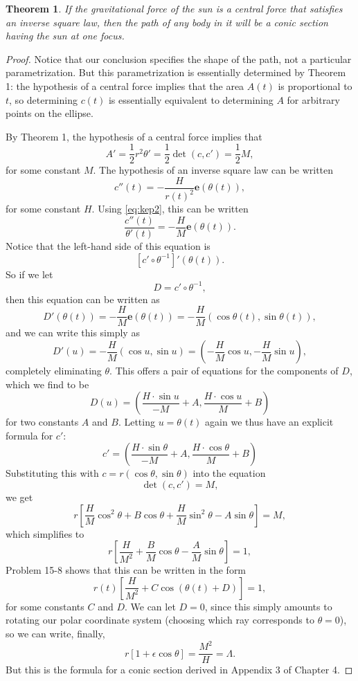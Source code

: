 \documentclass{article}
\newtheorem{theorem}{Theorem}
\begin{document}
\begin{theorem}
  If the gravitational force of the sun is a central force that satisfies an
  inverse square law, then the path of any body in it will be a conic section
  having the sun at one focus.
\end{theorem}
\begin{proof}
  Notice that our conclusion specifies the shape of the path, not a particular
  parametrization. But this parametrization is essentially determined by
  Theorem 1: the hypothesis of a central force implies that the area $A(t)$ is
  proportional to $t$, so determining $c(t)$ is essentially equivalent to
  determining $A$ for arbitrary points on the ellipse.

  By Theorem 1, the hypothesis of a central force implies that
  \begin{equation} \tag{$K_2$}
    A' = \frac{1}{2}r^2\theta' = \frac{1}{2}\det(c, c') = \frac{1}{2}M,
  \end{equation}
  for some constant $M$. The hypothesis of an inverse square law can be written
  \begin{equation} \label{eq:planet-acc-1} \tag{*}
    c''(t) = -\frac{H}{r(t)^2}\mathbf{e}(\theta(t)),
  \end{equation}
  for some constant $H$. Using \eqref{eq:kep2}, this can be written \[
    \frac{c''(t)}{\theta'(t)} = -\frac{H}{M}\mathbf{e}(\theta(t)).
  \] Notice that the left-hand side of this equation is \[
    [c' \circ \theta^{-1}]'(\theta(t)).
  \] So if we let \[
    D = c' \circ \theta^{-1},
  \] then this equation can be written as \[
    D'(\theta(t)) = -\frac{H}{M}\mathbf{e}(\theta(t))
    = -\frac{H}{M}(\cos \theta(t), \sin \theta(t)),
  \] and we can write this simply as \[
    D'(u) = -\frac{H}{M}(\cos u, \sin u)
    = \left(-\frac{H}{M} \cos u, -\frac{H}{M} \sin u\right),
  \] completely eliminating $\theta$. This offers a pair of equations for the
  components of $D$, which we find to be \[
    D(u) = \left(
      \frac{H \cdot \sin u}{-M} + A,
      \frac{H \cdot \cos u}{M} + B
    \right)
  \] for two constants $A$ and $B$. Letting $u = \theta(t)$ again we thus have
  an explicit formula for $c'$: \[
    c' = \left(
      \frac{H \cdot \sin \theta}{-M} + A,
      \frac{H \cdot \cos \theta}{M} + B
    \right)
  \] Substituting this with $c = r(\cos \theta, \sin \theta)$ into the equation
  \begin{equation} \tag{$K_2$}
    \det(c, c') = M,
  \end{equation} we get \[
    r\left[
      \frac{H}{M} \cos^2 \theta + B \cos \theta
      + \frac{H}{M} \sin^2 \theta - A \sin \theta
    \right] = M,
  \] which simplifies to \[
    r\left[
      \frac{H}{M^2} + \frac{B}{M} \cos \theta - \frac{A}{M} \sin \theta
    \right] = 1,
  \] Problem 15-8 shows that this can be written in the form \[
    r(t)\left[\frac{H}{M^2} + C\cos(\theta(t) + D)\right] = 1,
  \] for some constants $C$ and $D$. We can let $D = 0$, since this simply
  amounts to rotating our polar coordinate system (choosing which ray
  corresponds to $\theta = 0$), so we can write, finally, \[
    r[1 + \epsilon \cos \theta] = \frac{M^2}{H} = \Lambda.
  \] But this is the formula for a conic section derived in Appendix 3 of
  Chapter 4.
\end{proof}
\end{document}
